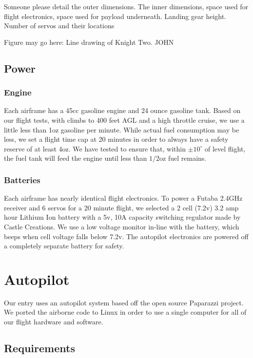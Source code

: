 \documentclass[10pt,twocolumns]{report}
\newcommand{\degrees}[1]
{
\begin{math}
#1^{\circ} 
\end{math}
}
\begin{document}
Someone please detail the outer dimensions. The inner dimensions, space used for flight electronics, space used for payload underneath. Landing gear height. Number of servos and their locations

Figure may go here: Line drawing of Knight Two. JOHN

\subsection{Power}

\subsubsection{Engine}

Each airframe has a 45cc gasoline engine and 24 ounce gasoline tank. Based on our flight tests, with climbs to 400 feet AGL and a high throttle cruise, we use a little less than 1oz gasoline per minute. While actual fuel consumption may be less, we set a flight time cap at 20 minutes in order to always have a safety reserve of at least 4oz. We have tested to ensure that, within \degrees{\pm10} of level flight, the fuel tank will feed the engine until less than $1/2$oz fuel remains.

\subsubsection{Batteries}

Each airframe has nearly identical flight electronics. To power a Futaba 2.4GHz receiver and 6 servos for a 20 minute flight, we selected a 2 cell (7.2v) 3.2 amp hour Lithium Ion battery with a 5v, 10A capacity switching regulator made by Castle Creations. We use a low voltage monitor in-line with the battery, which beeps when cell voltage falls below 7.2v. The autopilot electronics are powered off a completely separate battery for safety.

\section{Autopilot}
Our entry uses an autopilot system based off the open source 
Paparazzi project\cite{paparazziweb}. 
We ported the airborne code to Linux in order to use a single computer for all of our flight hardware and software.

\subsection{Requirements}
\end{document}
